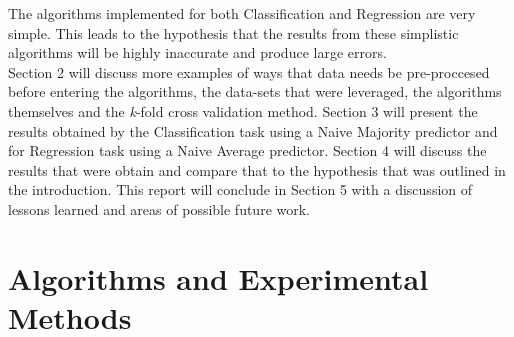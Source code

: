\documentclass[twoside,11pt]{article}
\begin{document}
\hspace*{10mm} The algorithms implemented for both Classification and Regression are very simple. This leads to the hypothesis that the results from these simplistic algorithms will be highly inaccurate and produce large errors.\\
\hspace*{10mm} Section 2 will discuss more examples of ways that data needs be pre-proccesed before entering the algorithms, the data-sets that were leveraged, the algorithms themselves and the \textit{k}-fold cross validation method. Section 3 will present the results obtained by the Classification task using a Naive Majority predictor and for Regression task using a Naive Average predictor. Section 4 will discuss the results that were obtain and compare that to the hypothesis that was outlined in the introduction. This report will conclude in Section 5 with a discussion of lessons learned and areas of possible future work.\newline


\section{Algorithms and Experimental Methods}
\end{document}
